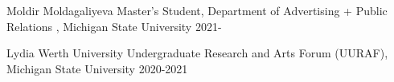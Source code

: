 


\begin{cvhonors}

  \cvhonor
      {Moldir Moldagaliyeva} %
    {Master's Student, Department of Advertising + Public Relations , Michigan State University} %
    {} %
    {2021-} %
    
\cvhonor
    {Lydia Werth} %
    {University Undergraduate Research and Arts Forum (UURAF), Michigan State University} %
    {} %
    {2020-2021} %
\end{cvhonors}
